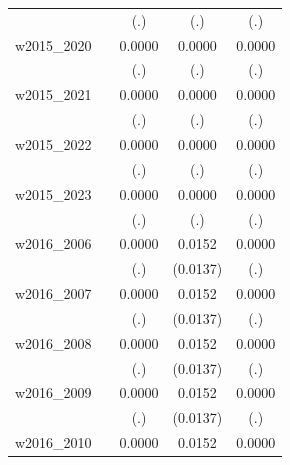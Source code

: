 \begin{table}[htbp]
\begin{tabular}{l*{4}{c}}
            &                     &         (.)         &         (.)         &         (.)         \\
[1em]
w2015\_2020  &                     &      0.0000         &      0.0000         &      0.0000         \\
            &                     &         (.)         &         (.)         &         (.)         \\
[1em]
w2015\_2021  &                     &      0.0000         &      0.0000         &      0.0000         \\
            &                     &         (.)         &         (.)         &         (.)         \\
[1em]
w2015\_2022  &                     &      0.0000         &      0.0000         &      0.0000         \\
            &                     &         (.)         &         (.)         &         (.)         \\
[1em]
w2015\_2023  &                     &      0.0000         &      0.0000         &      0.0000         \\
            &                     &         (.)         &         (.)         &         (.)         \\
[1em]
w2016\_2006  &                     &      0.0000         &      0.0152         &      0.0000         \\
            &                     &         (.)         &    (0.0137)         &         (.)         \\
[1em]
w2016\_2007  &                     &      0.0000         &      0.0152         &      0.0000         \\
            &                     &         (.)         &    (0.0137)         &         (.)         \\
[1em]
w2016\_2008  &                     &      0.0000         &      0.0152         &      0.0000         \\
            &                     &         (.)         &    (0.0137)         &         (.)         \\
[1em]
w2016\_2009  &                     &      0.0000         &      0.0152         &      0.0000         \\
            &                     &         (.)         &    (0.0137)         &         (.)         \\
[1em]
w2016\_2010  &                     &      0.0000         &      0.0152         &      0.0000         \\

\end{tabular}
\end{table}
